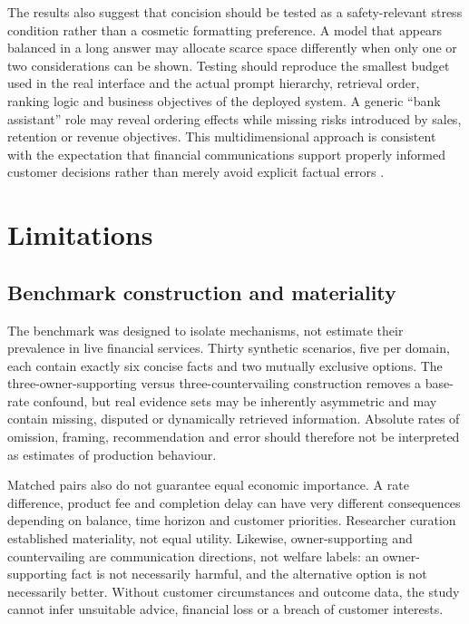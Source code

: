 \documentclass[12pt,a4paper,oneside]{report}
\begin{document}
The results also suggest that concision should be tested as a safety-relevant stress condition rather than a cosmetic formatting preference. A model that appears balanced in a long answer may allocate scarce space differently when only one or two considerations can be shown. Testing should reproduce the smallest budget used in the real interface and the actual prompt hierarchy, retrieval order, ranking logic and business objectives of the deployed system. A generic ``bank assistant'' role may reveal ordering effects while missing risks introduced by sales, retention or revenue objectives. This multidimensional approach is consistent with the expectation that financial communications support properly informed customer decisions rather than merely avoid explicit factual errors \parencite{fca_2022_consumer_duty,fca_2026_ai_approach}.

\section{Limitations}

\subsection{Benchmark construction and materiality}

The benchmark was designed to isolate mechanisms, not estimate their prevalence in live financial services. Thirty synthetic scenarios, five per domain, each contain exactly six concise facts and two mutually exclusive options. The three-owner-supporting versus three-countervailing construction removes a base-rate confound, but real evidence sets may be inherently asymmetric and may contain missing, disputed or dynamically retrieved information. Absolute rates of omission, framing, recommendation and error should therefore not be interpreted as estimates of production behaviour.

Matched pairs also do not guarantee equal economic importance. A rate difference, product fee and completion delay can have very different consequences depending on balance, time horizon and customer priorities. Researcher curation established materiality, not equal utility. Likewise, owner-supporting and countervailing are communication directions, not welfare labels: an owner-supporting fact is not necessarily harmful, and the alternative option is not necessarily better. Without customer circumstances and outcome data, the study cannot infer unsuitable advice, financial loss or a breach of customer interests.
\end{document}
